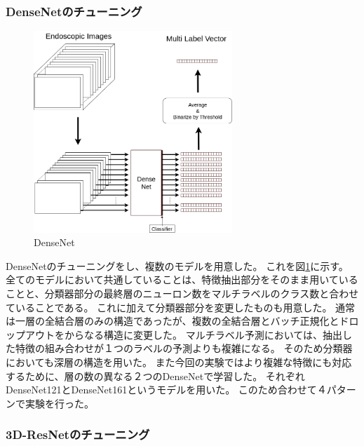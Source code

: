 \subsubsection{DenseNetのチューニング}

\begin{figure}[tb]
    \begin{center}
        \includegraphics[width=75mm]{./fig/ieice2.png}
        \caption{DenseNet}
        \label{fig:densenet}
    \end{center}
\end{figure}

DenseNetのチューニングをし、複数のモデルを用意した。
これを図\ref{fig:densenet}に示す。
全てのモデルにおいて共通していることは、特徴抽出部分をそのまま用いていることと、分類器部分の最終層のニューロン数をマルチラベルのクラス数と合わせていることである。
これに加えて分類器部分を変更したものも用意した。
通常は一層の全結合層のみの構造であったが、複数の全結合層とバッチ正規化とドロップアウトをからなる構造に変更した。
マルチラベル予測においては、抽出した特徴の組み合わせが１つのラベルの予測よりも複雑になる。
そのため分類器においても深層の構造を用いた。
また今回の実験ではより複雑な特徴にも対応するために、層の数の異なる２つのDenseNetで学習した。
それぞれDenseNet121\cite{DenseNet}とDenseNet161\cite{DenseNet}というモデルを用いた。
このため合わせて４パターンで実験を行った。
\subsubsection{3D-ResNetのチューニング}

